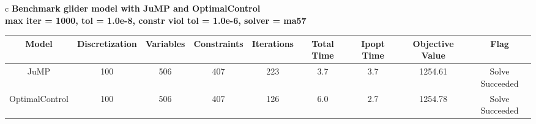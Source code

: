 \documentclass{standalone}
\begin{document}
\begin{tabular}{c}
\Large\textbf{Benchmark glider model with JuMP and OptimalControl}\\
\large\textbf{max iter = 1000, tol = 1.0e-8, constr viol tol = 1.0e-6, solver = ma57}\\
\begin{tabular}{ccccccccc}
  \hline
  \textbf{Model} & \textbf{Discretization} & \textbf{Variables} & \textbf{Constraints} & \textbf{Iterations} & \textbf{Total Time} & \textbf{Ipopt Time} & \textbf{Objective Value} & \textbf{Flag} \\\hline
  JuMP & 100 & 506 & 407 & 223 & 3.7 & 3.7 & 1254.61 & Solve Succeeded \\
  OptimalControl & 100 & 506 & 407 & 126 & 6.0 & 2.7 & 1254.78 & Solve Succeeded \\\hline
\end{tabular}
\end{tabular}
\end{document}
